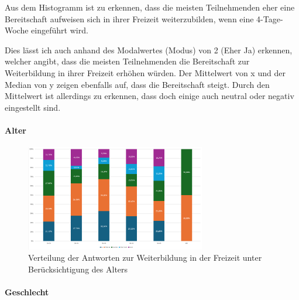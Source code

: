 Aus dem Histogramm ist zu erkennen, dass die meisten Teilnehmenden eher 
eine Bereitschaft aufweisen sich in ihrer Freizeit weiterzubilden, 
wenn eine 4-Tage-Woche eingeführt wird.

Dies lässt ich auch anhand des Modalwertes (Modus) von 2 (Eher Ja) erkennen, welcher angibt, dass die
meisten Teilnehmenden die Bereitschaft zur Weiterbildung in ihrer Freizeit erhöhen würden.
Der Mittelwert von x und der Median von y zeigen ebenfalls auf, dass die Bereitschaft steigt.
Durch den Mittelwert ist allerdings zu erkennen, dass doch einige auch neutral oder negativ 
eingestellt sind.


\paragraph*{Alter}

\begin{figure}
    \centering
    \includegraphics[width=0.7\textwidth]{04_Artefakte/01_Abbildungen/hypothese_9/weiterbildung_alter.png}
    \caption{Verteilung der Antworten zur Weiterbildung in der Freizeit unter Berücksichtigung des Alters}
    \label{fig:bereitschaft_weiterbildung_alter}
\end{figure}


\paragraph*{Geschlecht}

